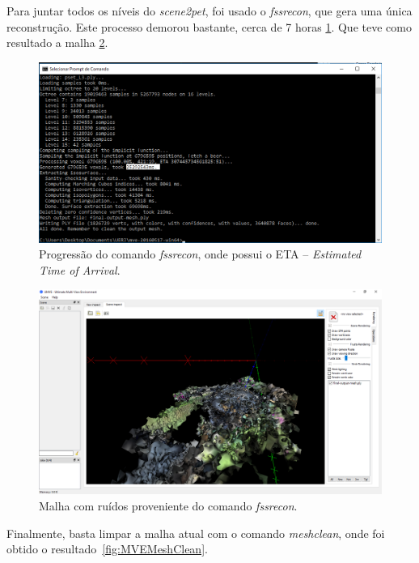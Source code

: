 Para juntar todos os níveis do \emph{scene2pet}, foi usado o \emph{fssrecon}, que gera uma única reconstrução. Este processo demorou bastante, cerca de 7 horas \ref{fig:MVEFSSR}. Que teve como resultado a malha \ref{fig:MVEFSSRMesh}.
\newpage %

\begin{figure}[!h]
	\centering
	\includegraphics[width=0.8\linewidth]{figs/mvemeshtempo2.png}
	\caption{%
	Progressão do comando \emph{fssrecon}, onde possui o ETA -- \emph{Estimated Time of Arrival}.
	}\label{fig:MVEFSSR}
\end{figure} 

\begin{figure}[!h]
	\centering
	\includegraphics[width=1\linewidth]{figs/mvemeshout.png}
	\caption{%
	Malha com ruídos proveniente do comando \emph{fssrecon}.
	}\label{fig:MVEFSSRMesh}
\end{figure} 

Finalmente, basta limpar a malha atual com o comando \emph{meshclean}, onde foi obtido o resultado~\ref{fig:MVEMeshClean}.

\newpage %


